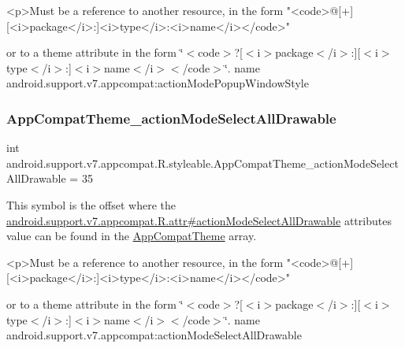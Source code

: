 \begin{DoxyVerb}      <p>Must be a reference to another resource, in the form "<code>@[+][<i>package</i>:]<i>type</i>:<i>name</i></code>"
\end{DoxyVerb}
 or to a theme attribute in the form \char`\"{}$<$code$>$?\mbox{[}$<$i$>$package$<$/i$>$\+:\mbox{]}\mbox{[}$<$i$>$type$<$/i$>$\+:\mbox{]}$<$i$>$name$<$/i$>$$<$/code$>$\char`\"{}.  name android.\+support.\+v7.\+appcompat\+:action\+Mode\+Popup\+Window\+Style \mbox{\label{classandroid_1_1support_1_1v7_1_1appcompat_1_1R_1_1styleable_a9daa3ba4c62eccd6f00e0b2c177300cc}} 
\subsubsection{\texorpdfstring{App\+Compat\+Theme\+\_\+action\+Mode\+Select\+All\+Drawable}{AppCompatTheme\_actionModeSelectAllDrawable}}
{\footnotesize\ttfamily int android.\+support.\+v7.\+appcompat.\+R.\+styleable.\+App\+Compat\+Theme\+\_\+action\+Mode\+Select\+All\+Drawable = 35\hspace{0.3cm}{\ttfamily [static]}}

This symbol is the offset where the \hyperlink{classandroid_1_1support_1_1v7_1_1appcompat_1_1R_1_1attr_a31728190ee213b9e5ffbbe837b33f781}{android.\+support.\+v7.\+appcompat.\+R.\+attr\#action\+Mode\+Select\+All\+Drawable} attribute\textquotesingle{}s value can be found in the \hyperlink{classandroid_1_1support_1_1v7_1_1appcompat_1_1R_1_1styleable_a5c42f89e8a410c323be34208d75c430b}{App\+Compat\+Theme} array.

\begin{DoxyVerb}      <p>Must be a reference to another resource, in the form "<code>@[+][<i>package</i>:]<i>type</i>:<i>name</i></code>"
\end{DoxyVerb}
 or to a theme attribute in the form \char`\"{}$<$code$>$?\mbox{[}$<$i$>$package$<$/i$>$\+:\mbox{]}\mbox{[}$<$i$>$type$<$/i$>$\+:\mbox{]}$<$i$>$name$<$/i$>$$<$/code$>$\char`\"{}.  name android.\+support.\+v7.\+appcompat\+:action\+Mode\+Select\+All\+Drawable \mbox{\label{classandroid_1_1support_1_1v7_1_1appcompat_1_1R_1_1styleable_a25ba173dd015eb93ea75a3a0882ee84a}} 
